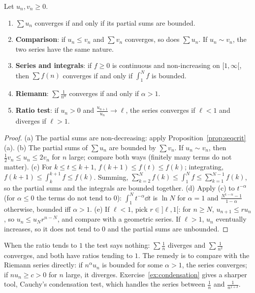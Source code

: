 \begin{proposition}\label{prop:posseries}
Let $u_n,v_n\ge0$.
\begin{enumerate}[label=(\alph*)]
\item $\sum u_n$ converges if and only if its partial sums are bounded.
\item \textbf{Comparison}: if $u_n\le v_n$ and $\sum v_n$ converges, so does $\sum u_n$. If $u_n\sim v_n$, the two series have the same nature.
\item \textbf{Series and integrals}: if $f\ge0$ is continuous and non-increasing on $[1,\infty[$, then $\sum f(n)$ converges if and only if $\int_1^Nf$ is bounded.
\item \textbf{Riemann}: $\sum\frac1{n^\alpha}$ converges if and only if $\alpha>1$.
\item \textbf{Ratio test}: if $u_n>0$ and $\frac{u_{n+1}}{u_n}\to\ell$, the series converges if $\ell<1$ and diverges if $\ell>1$.
\end{enumerate}
\end{proposition}
\begin{proof}
(a) The partial sums are non-decreasing: apply Proposition~\ref{prop:seqcrit}(a).
(b) The partial sums of $\sum u_n$ are bounded by $\sum v_n$. If $u_n\sim v_n$, then $\frac12v_n\le u_n\le2v_n$ for $n$ large; compare both ways (finitely many terms do not matter).
(c) For $k\le t\le k+1$, $f(k+1)\le f(t)\le f(k)$; integrating, $f(k+1)\le\int_k^{k+1}f\le f(k)$. Summing, $\sum_{k=2}^{N}f(k)\le\int_1^Nf\le\sum_{k=1}^{N-1}f(k)$, so the partial sums and the integrals are bounded together.
(d) Apply (c) to $t^{-\alpha}$ (for $\alpha\le0$ the terms do not tend to $0$): $\int_1^Nt^{-\alpha}\dd t$ is $\ln N$ for $\alpha=1$ and $\frac{N^{1-\alpha}-1}{1-\alpha}$ otherwise, bounded iff $\alpha>1$.
(e) If $\ell<1$, pick $r\in]\ell,1[$: for $n\ge N$, $u_{n+1}\le ru_n$, so $u_n\le u_Nr^{n-N}$, and compare with a geometric series. If $\ell>1$, $u_n$ eventually increases, so it does not tend to $0$ and the partial sums are unbounded.
\end{proof}

When the ratio tends to $1$ the test says nothing: $\sum\frac1n$ diverges and $\sum\frac1{n^2}$ converges, and both have ratios tending to $1$. The
remedy is to compare with the Riemann series directly: if $n^\alpha u_n$ is bounded for some $\alpha>1$, the series converges; if $nu_n\ge c>0$ for $n$
large, it diverges. Exercise~\ref{ex:condensation} gives a sharper tool, Cauchy's condensation test, which handles the series between $\frac1n$ and $\frac1{n^{1+\delta}}$.

